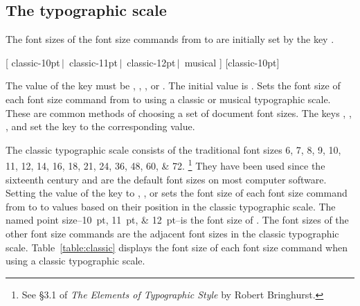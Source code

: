 \documentclass{beery}
\begin{document}
\subsection{The typographic scale}
\label{subsec:typographicscale}

The font sizes of the font size commands from  to  are initially set by the key .

  [%
    classic-10pt$\,\vert\,$\allowbreak
    classic-11pt$\,\vert\,$\allowbreak
    classic-12pt$\,\vert\,$\allowbreak\hspace*{1.5em}%
    musical%
  ]
  [classic-10pt]
\newline
{}
\newline
{}
\newline
{}
\nopagebreak\newline
{}

The value of the key  must be , , , or .
The initial value is .
Sets the font size of each font size command from  to  using a classic or musical typographic scale.
These are common methods of choosing a set of document font sizes.
The keys , , , and  set the key  to the corresponding value.



The classic typographic scale consists of the traditional font sizes
\numlist{6;7;8;9;10;11;12;14;16;18;21;24;36;48;60;72}.%
\footnote{See \S3.1 of \textit{The Elements of Typographic Style} by Robert Bringhurst.}
They have been used since the sixteenth century and are the default font sizes on most computer software.
Setting the value of the key  to , , or  sets the font size of each font size command from  to  to values based on their position in the classic typographic scale.
The named point size\---\qtylist[list-final-separator={, or }]{10;11;12}{pt}\---is the font size of .
The font sizes of the other font size commands are the adjacent font sizes in the classic typographic scale.
Table~\ref{table:classic} displays the font size of each font size command when using a classic typographic scale.
\end{document}
